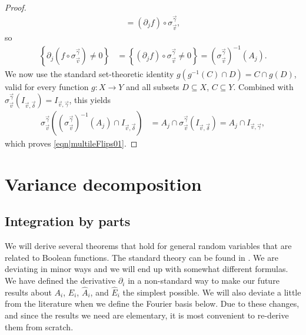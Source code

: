 \documentclass[reqno]{amsart}
\begin{document}
\begin{proof}
\begin{align*}
=
(\partial_j f)\circ \sigma_{\overrightarrow v}^{\overrightarrow\gamma},
\end{align*}
so
\begin{align*}
\left\{\partial_j \left(f\circ \sigma_{\overrightarrow v}^{\overrightarrow\gamma}\right)\neq 0\right\}
&=
\left\{(\partial_j f)\circ \sigma_{\overrightarrow v}^{\overrightarrow\gamma}\neq 0\right\}
=
\left(\sigma_{\overrightarrow v}^{\overrightarrow\gamma}\right)^{-1}(A_j).
\end{align*}
We now use the standard set-theoretic identity 
$g\!\left(g^{-1}(C)\cap D\right)=C\cap g(D)$, valid for every function 
$g:X\to Y$ and all subsets $D\subseteq X$, $C\subseteq Y$. Combined 
with $\sigma_{\overrightarrow v}^{\overrightarrow \gamma}
\!\left(I_{\overrightarrow v,\overrightarrow\delta}\right)
=I_{\overrightarrow v,\overrightarrow\gamma}$, this yields
\begin{align*}
\sigma_{\overrightarrow v}^{\overrightarrow \gamma}\!\left(
\left(\sigma_{\overrightarrow v}^{\overrightarrow\gamma}\right)^{-1}\!(A_j)
\cap I_{\overrightarrow v,\overrightarrow\delta}\right)
&=
A_j\cap \sigma_{\overrightarrow v}^{\overrightarrow \gamma}\!\left(
I_{\overrightarrow v,\overrightarrow\delta}\right)
=
A_j\cap I_{\overrightarrow v,\overrightarrow\gamma},
\end{align*}
which proves \eqref{eqn|multileFlips01}.
\end{proof}





\section{Variance decomposition}


\subsection{Integration by parts} We will derive several theorems that hold for general random variables that are related to Boolean functions. The standard theory can be found in \cite{ODonnell2014}. We are deviating in minor ways and we will end up with somewhat different formulas. We have defined the derivative $\partial_i$ in a non-standard way to make our future results about $A_i$, $E_i$, $\hat A_i$, and $\hat E_i$ the simplest possible. We will also deviate a little from the literature when we define the Fourier basis below. Due to these changes, and since the results we need are elementary, it is most convenient to re-derive them from scratch.  
\end{document}
